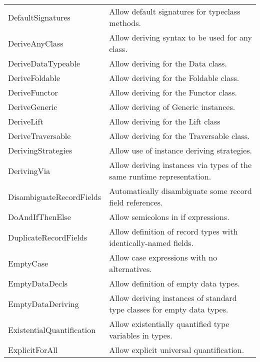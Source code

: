 \documentclass[openany, 12pt]{book}
\begin{document}
\begin{center}
\begin{supertabular}{ll}
		DefaultSignatures          & Allow default signatures for typeclass methods.                            \\
		DeriveAnyClass             & Allow deriving syntax to be used for any class.                            \\
		DeriveDataTypeable         & Allow deriving for the Data class.                                         \\
		DeriveFoldable             & Allow deriving for the Foldable class.                                     \\
		DeriveFunctor              & Allow deriving for the Functor class.                                      \\
		DeriveGeneric              & Allow deriving of Generic instances.                                       \\
		DeriveLift                 & Allow deriving for the Lift class                                          \\
		DeriveTraversable          & Allow deriving for the Traversable class.                                  \\
		DerivingStrategies         & Allow use of instance deriving strategies.                                 \\
		DerivingVia                & Allow deriving instances via types of the same runtime representation.     \\
		DisambiguateRecordFields   & Automatically disambiguate some record field references.                   \\
		DoAndIfThenElse            & Allow semicolons in if expressions.                                        \\
		DuplicateRecordFields      & Allow definition of record types with identically-named fields.            \\
		EmptyCase                  & Allow case expressions with no alternatives.                               \\
		EmptyDataDecls             & Allow definition of empty data types.                                      \\
		EmptyDataDeriving          & Allow deriving instances of standard type classes for empty data types.    \\
		ExistentialQuantification  & Allow existentially quantified type variables in types.                    \\
		ExplicitForAll             & Allow explicit universal quantification.                                   \\

\end{supertabular}
\end{center}
\end{document}
